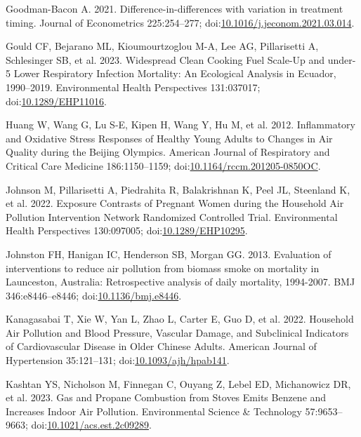 \documentclass[
  letterpaper,
  DIV=11,
  numbers=noendperiod]{scrartcl}
\newlength{\cslhangindent}
\newenvironment{CSLReferences}[2] %
 {\begin{list}{}{%
  \setlength{\itemindent}{0pt}
  \setlength{\leftmargin}{0pt}
  \setlength{\parsep}{0pt}
  \ifodd #1
   \setlength{\leftmargin}{\cslhangindent}
   \setlength{\itemindent}{-1\cslhangindent}
  \fi
  \setlength{\itemsep}{#2\baselineskip}}}
 {\end{list}}
\begin{document}
\begin{CSLReferences}{1}{1}
Goodman-Bacon A. 2021. Difference-in-differences with variation in
treatment timing. Journal of Econometrics 225:254--277;
doi:\href{https://doi.org/10.1016/j.jeconom.2021.03.014}{10.1016/j.jeconom.2021.03.014}.

Gould CF, Bejarano ML, Kioumourtzoglou M-A, Lee AG, Pillarisetti A,
Schlesinger SB, et al. 2023. Widespread {Clean Cooking Fuel Scale-Up}
and under-5 {Lower Respiratory Infection Mortality}: {An Ecological
Analysis} in {Ecuador}, 1990--2019. Environmental Health Perspectives
131:037017;
doi:\href{https://doi.org/10.1289/EHP11016}{10.1289/EHP11016}.

Huang W, Wang G, Lu S-E, Kipen H, Wang Y, Hu M, et al. 2012.
Inflammatory and {Oxidative Stress Responses} of {Healthy Young Adults}
to {Changes} in {Air Quality} during the {Beijing Olympics}. American
Journal of Respiratory and Critical Care Medicine 186:1150--1159;
doi:\href{https://doi.org/10.1164/rccm.201205-0850OC}{10.1164/rccm.201205-0850OC}.

Johnson M, Pillarisetti A, Piedrahita R, Balakrishnan K, Peel JL,
Steenland K, et al. 2022. Exposure {Contrasts} of {Pregnant Women}
during the {Household Air Pollution Intervention Network Randomized
Controlled Trial}. Environmental Health Perspectives 130:097005;
doi:\href{https://doi.org/10.1289/EHP10295}{10.1289/EHP10295}.

Johnston FH, Hanigan IC, Henderson SB, Morgan GG. 2013. Evaluation of
interventions to reduce air pollution from biomass smoke on mortality in
{Launceston}, {Australia}: Retrospective analysis of daily mortality,
1994-2007. BMJ 346:e8446--e8446;
doi:\href{https://doi.org/10.1136/bmj.e8446}{10.1136/bmj.e8446}.

Kanagasabai T, Xie W, Yan L, Zhao L, Carter E, Guo D, et al. 2022.
Household {Air Pollution} and {Blood Pressure}, {Vascular Damage}, and
{Subclinical Indicators} of {Cardiovascular Disease} in {Older Chinese
Adults}. American Journal of Hypertension 35:121--131;
doi:\href{https://doi.org/10.1093/ajh/hpab141}{10.1093/ajh/hpab141}.

Kashtan YS, Nicholson M, Finnegan C, Ouyang Z, Lebel ED, Michanowicz DR,
et al. 2023. Gas and {Propane Combustion} from {Stoves Emits Benzene}
and {Increases Indoor Air Pollution}. Environmental Science \&
Technology 57:9653--9663;
doi:\href{https://doi.org/10.1021/acs.est.2c09289}{10.1021/acs.est.2c09289}.


\end{CSLReferences}
\end{document}
